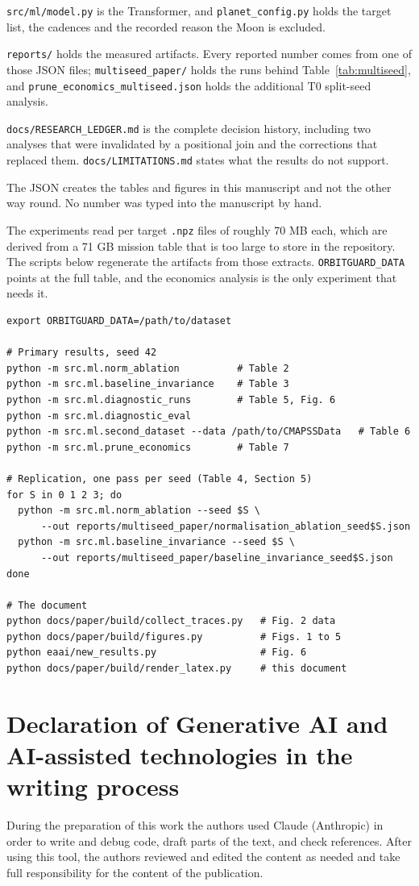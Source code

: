 \documentclass[preprint,12pt,authoryear,doubleblind]{elsarticle}
\begin{document}
\texttt{src/ml/model.py} is the Transformer, and \texttt{planet\_config.py} holds the target list, the cadences and the recorded reason the Moon is excluded.

\texttt{reports/} holds the measured artifacts. Every reported number comes from one of those JSON files; \texttt{multiseed\_paper/} holds the runs behind Table~\ref{tab:multiseed}, and \texttt{prune\_economics\_multiseed.json} holds the additional T0 split-seed analysis.

\texttt{docs/RESEARCH\_LEDGER.md} is the complete decision history, including two analyses that were invalidated by a positional join and the corrections that replaced them. \texttt{docs/LIMITATIONS.md} states what the results do not support.

The JSON creates the tables and figures in this manuscript and not the other way round. No number was typed into the manuscript by hand.

The experiments read per target \texttt{.npz} files of roughly 70 MB each, which are derived from a 71 GB mission table that is too large to store in the repository. The scripts below regenerate the artifacts from those extracts. \texttt{ORBITGUARD\_DATA} points at the full table, and the economics analysis is the only experiment that needs it.

{\scriptsize
\begin{verbatim}
export ORBITGUARD_DATA=/path/to/dataset

# Primary results, seed 42
python -m src.ml.norm_ablation          # Table 2
python -m src.ml.baseline_invariance    # Table 3
python -m src.ml.diagnostic_runs        # Table 5, Fig. 6
python -m src.ml.diagnostic_eval
python -m src.ml.second_dataset --data /path/to/CMAPSSData   # Table 6
python -m src.ml.prune_economics        # Table 7

# Replication, one pass per seed (Table 4, Section 5)
for S in 0 1 2 3; do
  python -m src.ml.norm_ablation --seed $S \
      --out reports/multiseed_paper/normalisation_ablation_seed$S.json
  python -m src.ml.baseline_invariance --seed $S \
      --out reports/multiseed_paper/baseline_invariance_seed$S.json
done

# The document
python docs/paper/build/collect_traces.py   # Fig. 2 data
python docs/paper/build/figures.py          # Figs. 1 to 5
python eaai/new_results.py                  # Fig. 6
python docs/paper/build/render_latex.py     # this document
\end{verbatim}
}


\section*{Declaration of Generative AI and AI-assisted technologies in the writing process}
During the preparation of this work the authors used Claude (Anthropic) in order to write and debug code, draft parts of the text, and check references. After using this tool, the authors reviewed and edited the content as needed and take full responsibility for the content of the publication.



\end{document}
